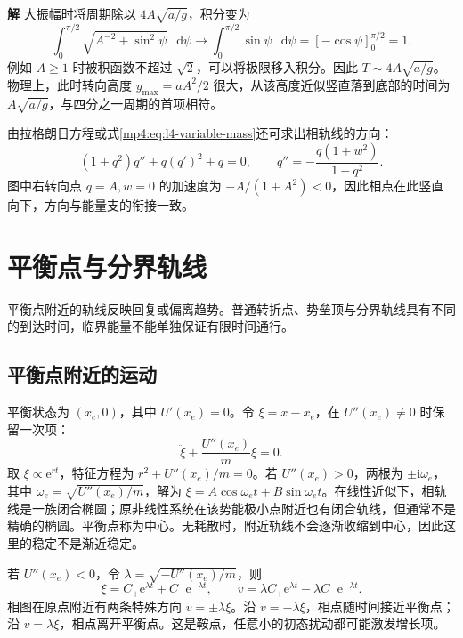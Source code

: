 \documentclass[11pt,openany,fontset=fandol]{ctexbook}
\theoremstyle{definition}\newtheorem{example}{例}[chapter]\newtheorem{exercise}{习题}[chapter]
\newcommand{\SolutionStart}{\par\medskip\ifdim\pagetotal>0pt\ifdim\dimexpr\pagegoal-\pagetotal\relax<3\baselineskip\newpage\fi\fi\noindent\textbf{解}\quad\ignorespaces}
\newenvironment{solution}{\SolutionStart}{\par\medskip}
\newcommand{\dd}{\mathop{}\!\mathrm d}\newcommand{\ee}{\mathrm e}\newcommand{\vct}[1]{\bm{#1}}
\begin{document}
\begin{solution}
大振幅时将周期除以 $4A\sqrt{a/g}$，积分变为
\[
\int_0^{\pi/2}\sqrt{A^{-2}+\sin^2\psi}\,\dd\psi
\longrightarrow\int_0^{\pi/2}\sin\psi\,\dd\psi
=[-\cos\psi]_0^{\pi/2}=1.
\]
例如 $A\ge1$ 时被积函数不超过 $\sqrt2$，可以将极限移入积分。因此 $T\sim4A\sqrt{a/g}$。物理上，此时转向高度 $y_{\max}=aA^2/2$ 很大，从该高度近似竖直落到底部的时间为 $A\sqrt{a/g}$，与四分之一周期的首项相符。

由拉格朗日方程或式\eqref{mp4:eq:l4-variable-mass}还可求出相轨线的方向：
\[
(1+q^2)q''+q(q')^2+q=0,
\qquad q''=-\frac{q(1+w^2)}{1+q^2}.
\]
图中右转向点 $q=A,w=0$ 的加速度为 $-A/(1+A^2)<0$，因此相点在此竖直向下，方向与能量支的衔接一致。
\end{solution}

\section{平衡点与分界轨线}
平衡点附近的轨线反映回复或偏离趋势。普通转折点、势垒顶与分界轨线具有不同的到达时间，临界能量不能单独保证有限时间通行。

\subsection{平衡点附近的运动}
平衡状态为 $(x_e,0)$，其中 $U'(x_e)=0$。令 $\xi=x-x_e$，在 $U''(x_e)\ne0$ 时保留一次项：
\[
\ddot\xi+\frac{U''(x_e)}m\xi=0.
\]
取 $\xi\propto\ee^{rt}$，特征方程为 $r^2+U''(x_e)/m=0$。若 $U''(x_e)>0$，两根为 $\pm\mathrm i\omega_e$，其中 $\omega_e=\sqrt{U''(x_e)/m}$，解为 $\xi=A\cos\omega_et+B\sin\omega_et$。在线性近似下，相轨线是一族闭合椭圆；原非线性系统在该势能极小点附近也有闭合轨线，但通常不是精确的椭圆。平衡点称为中心。无耗散时，附近轨线不会逐渐收缩到中心，因此这里的稳定不是渐近稳定。

若 $U''(x_e)<0$，令 $\lambda=\sqrt{-U''(x_e)/m}$，则
\[
\xi=C_+\ee^{\lambda t}+C_-\ee^{-\lambda t},\qquad
v=\lambda C_+\ee^{\lambda t}-\lambda C_-\ee^{-\lambda t}.
\]
相图在原点附近有两条特殊方向 $v=\pm\lambda\xi$。沿 $v=-\lambda\xi$，相点随时间接近平衡点；沿 $v=\lambda\xi$，相点离开平衡点。这是鞍点，任意小的初态扰动都可能激发增长项。
\end{document}
